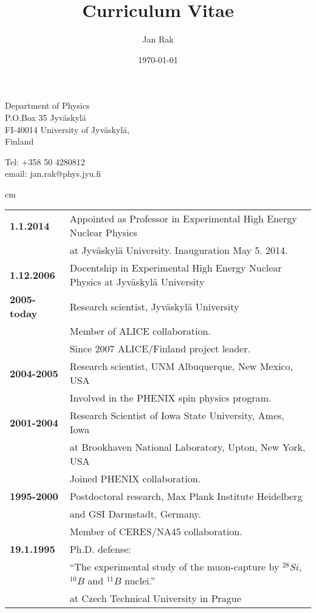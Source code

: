 \documentclass[12pt]{article}
\title{Curriculum Vitae}
\author{Jan Rak}
\date{\today}
\begin{document}
\maketitle

\parbox{7cm}{
Department of Physics\\
P.O.Box 35 Jyv\"askyl\"a\\
FI-40014 University of Jyv\"askyl\"a,\\ 
Finland}
\hfill
\parbox{5cm}{
Tel: +358 50 4280812\\
email: jan.rak@phys.jyu.fi\\
}

 cm

\noindent
\begin{tabular}{ll}
{\bf 1.1.2014} 		& Appointed as Professor in Experimental High Energy Nuclear Physics\\
				& at  Jyv\"askyl\"a University. Inauguration May 5. 2014. \\
{\bf 1.12.2006} 		& Docentship in Experimental High Energy Nuclear Physics at  Jyv\"askyl\"a University \\
{\bf 2005-today} 	& Research scientist, Jyv\"askyl\"a University \\
				& Member of ALICE collaboration.\\
				& Since 2007 ALICE/Finland project leader.\\
{\bf 2004-2005}  	& Research scientist, UNM Albuquerque, New Mexico, USA\\
				& Involved in the PHENIX spin physics program.\\
{\bf 2001-2004}  	& Research Scientist of Iowa State University, Ames, Iowa \\  						
				& at Brookhaven National Laboratory, Upton, New York, USA\\
				& Joined PHENIX collaboration. \\%
{\bf 1995-2000} 	& Postdoctoral research, Max Plank Institute Heidelberg\\
				& and GSI Darmstadt, Germany.\\ 
				& Member of CERES/NA45 collaboration. \\%
{\bf 19.1.1995} 		& Ph.D. defense:\\
				& ``The experimental study of the muon-capture by $^{28}Si$, $^{10}B$ and  $^{11}B$ nuclei.''\\
				& at Czech Technical University in Prague\\

\end{tabular}
\end{document}
